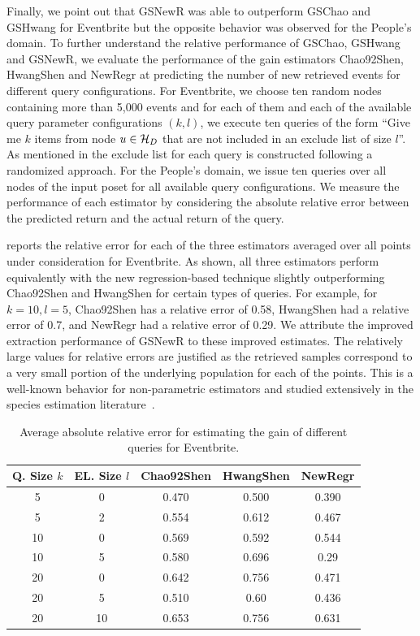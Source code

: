 \vspace{3pt}
Finally, we point out that GSNewR was able to outperform GSChao and GSHwang for Eventbrite but the opposite behavior was observed for the People's domain. To further understand the relative performance of GSChao, GSHwang and GSNewR, we evaluate the performance of the gain estimators Chao92Shen, HwangShen and NewRegr at predicting the number of new retrieved events for different query configurations. For Eventbrite, we choose ten random nodes containing more than 5,000 events and for each of them and each of the available query parameter configurations $(k,l)$, we execute ten queries of the form ``Give me $k$ items from node $u \in \mathcal{H}_D$ that are not included in an exclude list of size $l$''. As mentioned in  the exclude list for each query is constructed following a randomized approach.  For the People's domain, we issue ten queries over all nodes of the input poset for all available query configurations.  We measure the performance of each estimator by considering the absolute relative error between the predicted return and the actual return of the query. 

 reports the relative error for each of the three estimators averaged over all points under consideration for Eventbrite. As shown, all three estimators perform equivalently with the new regression-based technique slightly outperforming Chao92Shen and HwangShen for certain types of queries. For example, for $k = 10, l = 5$, Chao92Shen has a relative error of 0.58, HwangShen had a relative error of 0.7, and NewRegr had a relative error of 0.29. We attribute the improved extraction performance of GSNewR to these improved estimates. The relatively large values for relative errors are justified as the retrieved samples correspond to a very small portion of the underlying population for each of the points. This is a well-known behavior for non-parametric estimators and studied extensively in the species estimation literature~\cite{hwang:2010}. 

\begin{table}
\small \center
\caption{Average absolute relative error for estimating the gain of different queries for Eventbrite.}
\label{tab:eventesterror}
\begin{tabular}{|c|c|c|c|c|}
\hline
\textbf{Q. Size $k$} & \textbf{EL. Size $l$} & \textbf{Chao92Shen} & \textbf{HwangShen} & \textbf{NewRegr} \\ \hline
5 & 0 & 0.470 & 0.500 & 0.390 \\
5 & 2 & 0.554 & 0.612 & 0.467\\
10 & 0 & 0.569 & 0.592 & 0.544\\
10 & 5 & 0.580 & 0.696 & 0.29\\
20 & 0 & 0.642 & 0.756 &0.471\\
20 & 5 & 0.510 & 0.60 & 0.436 \\
20 & 10 & 0.653 & 0.756 & 0.631\\
\hline
\end{tabular}
\end{table}

